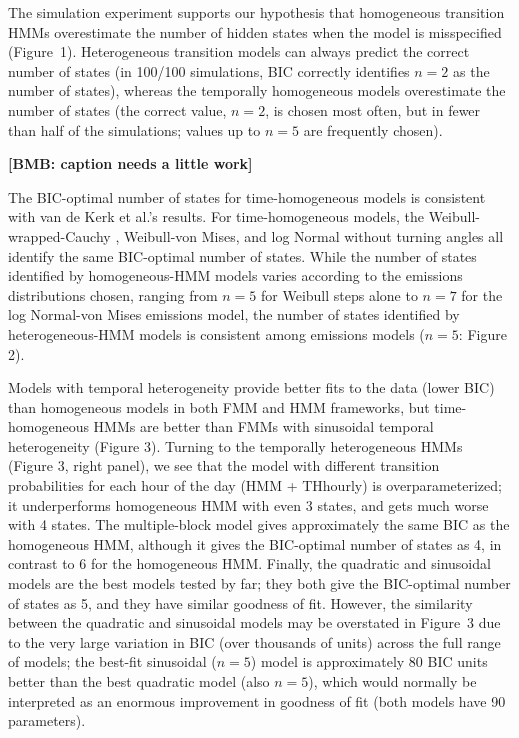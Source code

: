 \documentclass{bmcart}
\newcommand{\bmb}[1]{\textbf{[BMB: #1]}}
\begin{document}
The simulation experiment supports our hypothesis that homogeneous transition HMMs overestimate the number of hidden states when the model is misspecified (Figure~1). Heterogeneous transition models can always predict the correct number of states (in 100/100 simulations, BIC correctly identifies $n=2$ as the number of states), whereas the temporally homogeneous models overestimate the number of states (the correct value, $n=2$, is chosen most often, but in fewer than half of the simulations; values up to $n=5$ are frequently chosen).

\bmb{caption needs a little work}


The BIC-optimal number of states for time-homogeneous models is
consistent with van de Kerk et al.'s \cite{kerk2015hidden}
results. For time-homogeneous models, the Weibull-wrapped-Cauchy
\cite{kerk2015hidden}, Weibull-von Mises, and log Normal without
turning angles all identify the same BIC-optimal number of
states. While the number of states identified
by homogeneous-HMM models varies according to the emissions
distributions chosen, ranging from $n=5$ for Weibull
steps alone to $n=7$ for the log Normal-von Mises emissions
model, the number of states identified
by heterogeneous-HMM models
is consistent among emissions models ($n=5$: Figure 2).


Models with temporal heterogeneity provide better fits to the data
(lower BIC) than homogeneous models in both FMM and HMM frameworks,
but time-homogeneous HMMs are better than FMMs with sinusoidal
temporal heterogeneity (Figure 3). Turning to the temporally
heterogeneous HMMs (Figure 3, right panel), we see that the model with
different transition probabilities for each hour of the day (HMM +
THhourly) is overparameterized; it underperforms homogeneous HMM with
even 3 states, and gets much worse with 4 states. The multiple-block
model gives approximately the same BIC as the homogeneous HMM,
although it gives the BIC-optimal number of states as 4, in contrast
to 6 for the homogeneous HMM.  Finally, the quadratic and sinusoidal
models are the best models tested by far; they both give the
BIC-optimal number of states as 5, and they have similar goodness of
fit.  However, the similarity between the quadratic 
and sinusoidal models may be overstated in Figure~3 due to the very large
variation in BIC (over thousands of units) across the full range of
models; the best-fit sinusoidal ($n=5$) model is approximately 80 BIC units
better than the best quadratic model (also $n=5$), which
would normally be interpreted as an enormous improvement in goodness of
fit (both models have 90 parameters).
\end{document}
